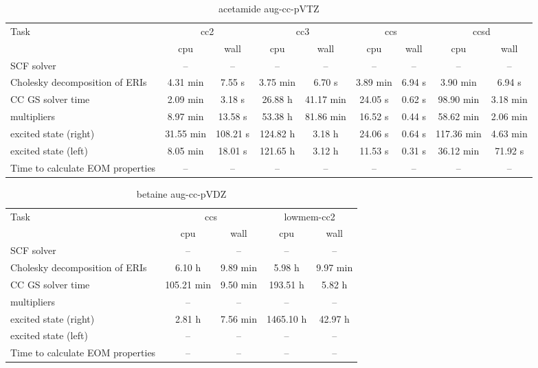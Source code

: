 \documentclass{article}
\begin{document}
\begin{table}
\caption{acetamide aug-cc-pVTZ}
\begin{tabular}{lcccccccc}
\toprule
Task & \multicolumn{2}{c}{cc2} & \multicolumn{2}{c}{cc3} & \multicolumn{2}{c}{ccs} & \multicolumn{2}{c}{ccsd}\\
\cmidrule(lr){2-3}\cmidrule(lr){4-5}\cmidrule(lr){6-7}\cmidrule(lr){8-9}
 & cpu & wall & cpu & wall & cpu & wall & cpu & wall\\
\midrule
SCF solver & -- & -- & -- & -- & -- & -- & -- & --\\
Cholesky decomposition of ERIs & 4.31 min & 7.55 s & 3.75 min & 6.70 s & 3.89 min & 6.94 s & 3.90 min & 6.94 s\\
CC GS solver time & 2.09 min & 3.18 s & 26.88 h & 41.17 min & 24.05 s & 0.62 s & 98.90 min & 3.18 min\\
multipliers & 8.97 min & 13.58 s & 53.38 h & 81.86 min & 16.52 s & 0.44 s & 58.62 min & 2.06 min\\
excited state (right) & 31.55 min & 108.21 s & 124.82 h & 3.18 h & 24.06 s & 0.64 s & 117.36 min & 4.63 min\\
excited state (left) & 8.05 min & 18.01 s & 121.65 h & 3.12 h & 11.53 s & 0.31 s & 36.12 min & 71.92 s\\
Time to calculate EOM properties & -- & -- & -- & -- & -- & -- & -- & --\\
\bottomrule
\end{tabular}
\end{table}
\begin{table}
\caption{betaine aug-cc-pVDZ}
\begin{tabular}{lcccc}
\toprule
Task & \multicolumn{2}{c}{ccs} & \multicolumn{2}{c}{lowmem-cc2}\\
\cmidrule(lr){2-3}\cmidrule(lr){4-5}
 & cpu & wall & cpu & wall\\
\midrule
SCF solver & -- & -- & -- & --\\
Cholesky decomposition of ERIs & 6.10 h & 9.89 min & 5.98 h & 9.97 min\\
CC GS solver time & 105.21 min & 9.50 min & 193.51 h & 5.82 h\\
multipliers & -- & -- & -- & --\\
excited state (right) & 2.81 h & 7.56 min & 1465.10 h & 42.97 h\\
excited state (left) & -- & -- & -- & --\\
Time to calculate EOM properties & -- & -- & -- & --\\
\bottomrule
\end{tabular}
\end{table}
\end{document}
